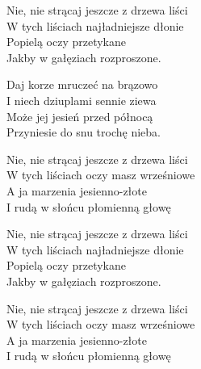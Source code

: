 \begin{text}
    Nie, nie strącaj jeszcze z drzewa liści\\
    W tych liściach najładniejsze dłonie\\
    Popielą oczy przetykane\\
    Jakby w gałęziach rozproszone.

    Daj korze mruczeć na brązowo\\
    I niech dziuplami sennie ziewa\\
    Może jej jesień przed północą\\
    Przyniesie do snu trochę nieba.

    Nie, nie strącaj jeszcze z drzewa liści\\
    W tych liściach oczy masz wrześniowe\\
    A ja marzenia jesienno-złote\\
    I rudą w słońcu płomienną głowę

    Nie, nie strącaj jeszcze z drzewa liści\\
    W tych liściach najładniejsze dłonie\\
    Popielą oczy przetykane\\
    Jakby w gałęziach rozproszone.

    Nie, nie strącaj jeszcze z drzewa liści\\
    W tych liściach oczy masz wrześniowe\\
    A ja marzenia jesienno-złote\\
    I rudą w słońcu płomienną głowę
\end{text}
\begin{chord}

\end{chord}
